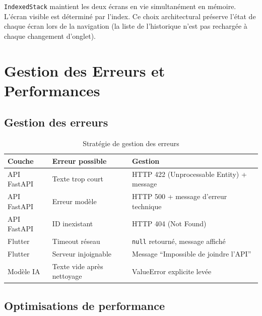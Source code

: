 \texttt{IndexedStack} maintient les deux écrans en vie simultanément en
mémoire. L'écran visible est déterminé par l'index. Ce choix architectural
préserve l'état de chaque écran lors de la navigation (la liste de l'historique
n'est pas rechargée à chaque changement d'onglet).

\section{Gestion des Erreurs et Performances}

\subsection{Gestion des erreurs}

\begin{table}[H]
\centering
\caption{Stratégie de gestion des erreurs}
\label{tab:errors}
\renewcommand{\arraystretch}{1.4}
\begin{tabular}{p{3cm} p{3.5cm} p{6cm}}
\toprule
\rowcolor{bleuprincipal!15}
\textbf{Couche} & \textbf{Erreur possible} & \textbf{Gestion} \\
\midrule
API FastAPI & Texte trop court & HTTP 422 (Unprocessable Entity) + message \\
\rowcolor{gray!8}
API FastAPI & Erreur modèle & HTTP 500 + message d'erreur technique \\
API FastAPI & ID inexistant & HTTP 404 (Not Found) \\
\rowcolor{gray!8}
Flutter & Timeout réseau & \texttt{null} retourné, message affiché \\
Flutter & Serveur injoignable & Message ``Impossible de joindre l'API'' \\
\rowcolor{gray!8}
Modèle IA & Texte vide après nettoyage & ValueError explicite levée \\
\bottomrule
\end{tabular}
\end{table}

\subsection{Optimisations de performance}

